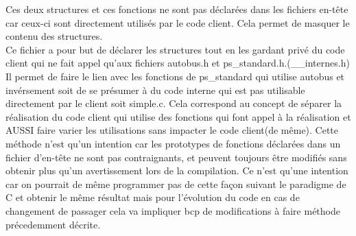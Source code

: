 \documentclass{article}
\begin{document}
\newline
Ces deux structures et ces fonctions ne sont pas déclarées dans les fichiers en-tête
car ceux-ci sont directement utilisés par le code client. Cela permet de masquer le contenu des structures.\\
Ce fichier a pour but de déclarer les structures tout en les gardant privé du code client
qui ne fait appel qu’aux fichiers autobus.h et ps\_standard.h.(\_\_internes.h)
\newline
Il permet de faire le lien avec les fonctions de ps\_standard qui utilise autobus et invérsement soit de se présumer à du code interne qui est pas utilisable directement par le client soit simple.c. Cela correspond au concept de séparer la réalisation du code client qui utilise des fonctions qui font appel à la réalisation et AUSSI faire varier les utilisations sans impacter le code client(de même).
\newline
Cette méthode n’est qu’un intention car les prototypes de fonctions déclarées dans un
fichier d’en-tête ne sont pas contraignants, et peuvent toujours être modifiés sans obtenir plus qu’un avertissement lors de la compilation. Ce n'est qu'une intention car on pourrait de même programmer pas de cette façon suivant le paradigme de C et obtenir le même résultat mais pour l'évolution du code en cas de changement de passager cela va impliquer bcp de modifications à faire \implis méthode précedemment décrite. 
\newline
\end{document}

